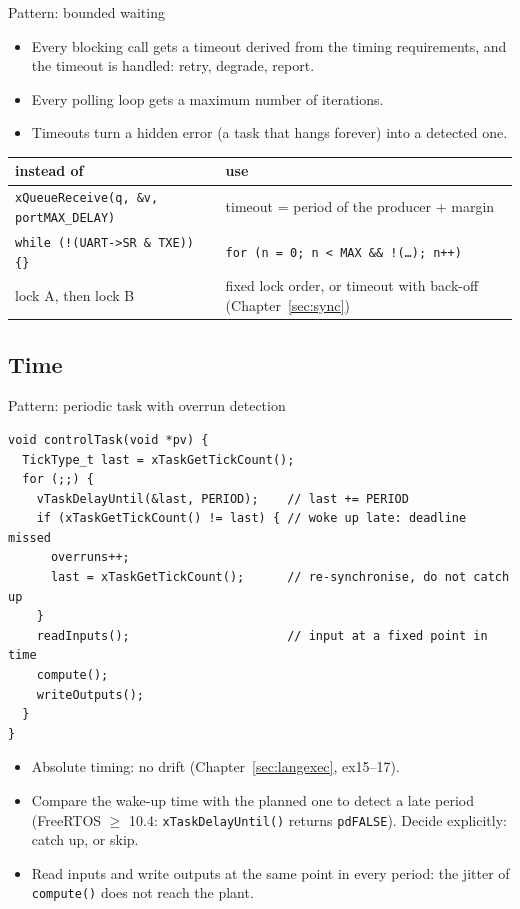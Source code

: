 \begin{frame}{Pattern: bounded waiting}
  \begin{itemize}
    \item Every blocking call gets a timeout derived from the timing requirements, and the timeout is handled: retry, degrade, report.
    \item Every polling loop gets a maximum number of iterations.
    \item Timeouts turn a hidden error (a task that hangs forever) into a detected one.
  \end{itemize}
  \begin{center}\small
  \begin{tabular}{@{}ll@{}}
    \toprule
    instead of & use \\
    \midrule
    \texttt{xQueueReceive(q, \&v, portMAX\_DELAY)} & timeout = period of the producer + margin \\
    \texttt{while (!(UART->SR \& TXE)) \{\}} & \texttt{for (n = 0; n < MAX \&\& !(\ldots); n++)} \\
    lock A, then lock B & fixed lock order, or timeout with back-off (Chapter~\ref{sec:sync}) \\
    \bottomrule
  \end{tabular}
  \end{center}
\end{frame}

\subsection{Time}
\begin{frame}[fragile]{Pattern: periodic task with overrun detection}
\begin{lstlisting}[basicstyle=\ttfamily\scriptsize]
void controlTask(void *pv) {
  TickType_t last = xTaskGetTickCount();
  for (;;) {
    vTaskDelayUntil(&last, PERIOD);    // last += PERIOD
    if (xTaskGetTickCount() != last) { // woke up late: deadline missed
      overruns++;
      last = xTaskGetTickCount();      // re-synchronise, do not catch up
    }
    readInputs();                      // input at a fixed point in time
    compute();
    writeOutputs();
  }
}
\end{lstlisting}
  \begin{itemize}
    \small
    \item Absolute timing: no drift (Chapter~\ref{sec:langexec}, ex15--17).
    \item Compare the wake-up time with the planned one to detect a late period (FreeRTOS $\ge$ 10.4: \texttt{xTaskDelayUntil()} returns \texttt{pdFALSE}). Decide explicitly: catch up, or skip.
    \item Read inputs and write outputs at the same point in every period: the jitter of \texttt{compute()} does not reach the plant.
  \end{itemize}
\end{frame}

